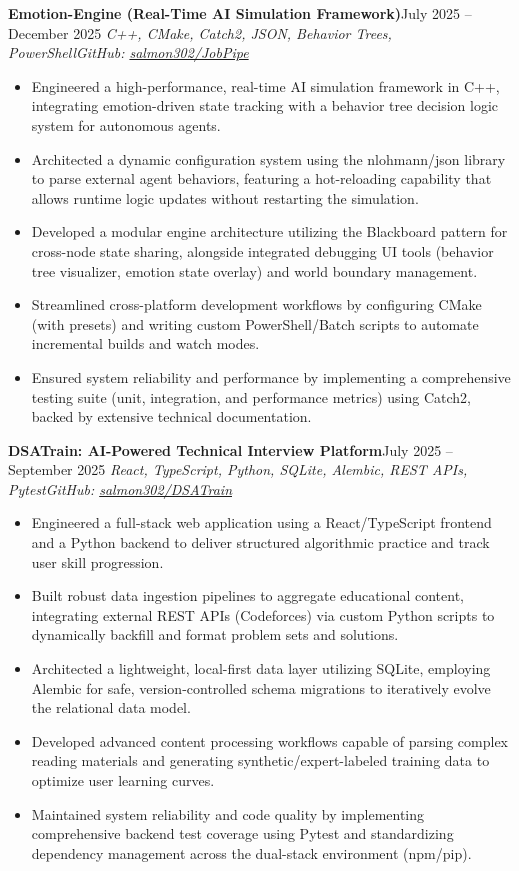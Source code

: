 \documentclass[letterpaper,11pt]{article}
\newcommand{\resumeEntry}[4]{
    \vspace{2pt}
    \noindent\textbf{#1}\hfill{#2}
    \newline
    \noindent\textit{#3}\hfill\textit{#4}
    \vspace{-3pt}
}
\newcommand{\resumeItemListStart}{\begin{itemize}[label=$\bullet$, leftmargin=1.1em, itemsep=0pt, parsep=0pt, topsep=2pt]}
\newcommand{\resumeItemListEnd}{\end{itemize}}
\begin{document}
    \resumeEntry
        {Emotion-Engine (Real-Time AI Simulation Framework)}
        {July 2025 – December 2025}
        {C++, CMake, Catch2, JSON, Behavior Trees, PowerShell}
        {GitHub: \href{https://github.com/salmon302/JobPipe}{salmon302/JobPipe}}
    \resumeItemListStart
        \item Engineered a high-performance, real-time AI simulation framework in C++, integrating emotion-driven state tracking with a behavior tree decision logic system for autonomous agents.
        \item Architected a dynamic configuration system using the nlohmann/json library to parse external agent behaviors, featuring a hot-reloading capability that allows runtime logic updates without restarting the simulation.
        \item Developed a modular engine architecture utilizing the Blackboard pattern for cross-node state sharing, alongside integrated debugging UI tools (behavior tree visualizer, emotion state overlay) and world boundary management.
        \item Streamlined cross-platform development workflows by configuring CMake (with presets) and writing custom PowerShell/Batch scripts to automate incremental builds and watch modes.
        \item Ensured system reliability and performance by implementing a comprehensive testing suite (unit, integration, and performance metrics) using Catch2, backed by extensive technical documentation.
    \resumeItemListEnd
    
    \resumeEntry
        {DSATrain: AI-Powered Technical Interview Platform}
        {July 2025 – September 2025}
        {React, TypeScript, Python, SQLite, Alembic, REST APIs, Pytest}
        {GitHub: \href{https://github.com/salmon302/DSATrain}{salmon302/DSATrain}}
    \resumeItemListStart
        \item Engineered a full-stack web application using a React/TypeScript frontend and a Python backend to deliver structured algorithmic practice and track user skill progression.
        \item Built robust data ingestion pipelines to aggregate educational content, integrating external REST APIs (Codeforces) via custom Python scripts to dynamically backfill and format problem sets and solutions.
        \item Architected a lightweight, local-first data layer utilizing SQLite, employing Alembic for safe, version-controlled schema migrations to iteratively evolve the relational data model.
        \item Developed advanced content processing workflows capable of parsing complex reading materials and generating synthetic/expert-labeled training data to optimize user learning curves.
        \item Maintained system reliability and code quality by implementing comprehensive backend test coverage using Pytest and standardizing dependency management across the dual-stack environment (npm/pip).
    \resumeItemListEnd
\end{document}

